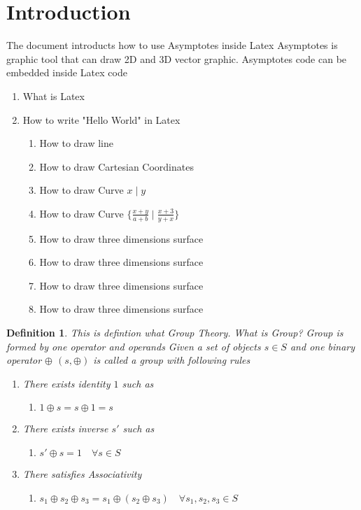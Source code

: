 \documentclass{article}
\newtheorem{defintion}{Definition}
\begin{document}
\section{Introduction}
The document introducts how to use Asymptotes inside Latex
Asymptotes is graphic tool that can draw 2D and 3D vector graphic.
Asymptotes code can be embedded inside Latex code
\begin{enumerate}
\item What is Latex 
\item How to write "Hello World" in Latex
    \begin{enumerate}
    \item How to draw line  
    \item How to draw Cartesian Coordinates  
    \item How to draw Curve $x \mid y$ 
    \item How to draw Curve $ \{ \frac{x + y}{a + b} \mid \frac{x+3}{y + x} \}$ 
    \item How to draw three dimensions surface 
    \item How to draw three dimensions surface 
    \item How to draw three dimensions surface 
    \item How to draw three dimensions surface 
    \end{enumerate} 
\end{enumerate}

\begin{defintion}
This is defintion what Group Theory.
What is Group?
Group is formed by one operator and operands
Given a set of objects $s \in S$ and one binary operator $\oplus$
$(s, \oplus)$ is called a group with following rules
\begin{enumerate}
\item There exists identity $1$ such as
    \begin{enumerate}
    \item $1 \oplus s = s \oplus 1 = s$ 
    \end{enumerate} 

\item There exists inverse $s'$ such as
    \begin{enumerate}
    \item $s' \oplus s = 1 \quad \forall s \in S$ 
    \end{enumerate} 

\item There satisfies Associativity 
    \begin{enumerate}
    \item  $s_1 \oplus s_2 \oplus s_3 = s_1 \oplus (s_2 \oplus s_3) \quad \forall s_1, s_2, s_3 \in S$ 
    \end{enumerate} 
\end{enumerate} 
\end{defintion}
\end{document}
